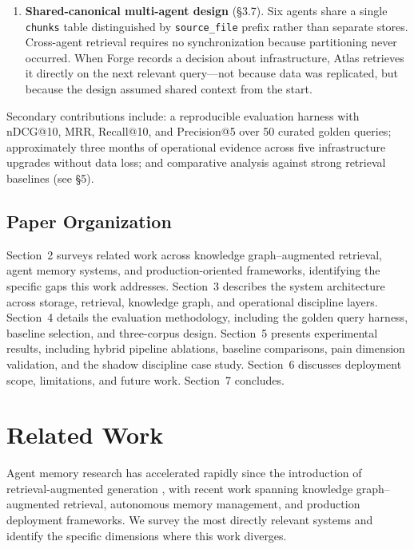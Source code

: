 \begin{enumerate}
\item \textbf{Shared-canonical multi-agent design} (\S3.7). Six agents share a single
\texttt{chunks} table distinguished by \texttt{source\_file} prefix rather than separate
stores. Cross-agent retrieval requires no synchronization because partitioning never
occurred. When Forge records a decision about infrastructure, Atlas retrieves it directly
on the next relevant query---not because data was replicated, but because the design
assumed shared context from the start.

\end{enumerate}

Secondary contributions include: a reproducible evaluation harness with nDCG@10, MRR,
Recall@10, and Precision@5 over 50 curated golden queries; approximately three months of operational
evidence across five infrastructure upgrades without data loss; and comparative analysis
against strong retrieval baselines (see \S5).

\subsection{Paper Organization}

Section~2 surveys related work across knowledge graph--augmented retrieval, agent memory
systems, and production-oriented frameworks, identifying the specific gaps this work
addresses. Section~3 describes the system architecture across storage, retrieval, knowledge
graph, and operational discipline layers. Section~4 details the evaluation methodology,
including the golden query harness, baseline selection, and three-corpus design. Section~5
presents experimental results, including hybrid pipeline ablations, baseline comparisons,
pain dimension validation, and the shadow discipline case study. Section~6 discusses
deployment scope, limitations, and future work. Section~7 concludes.

\section{Related Work}

Agent memory research has accelerated rapidly since the introduction of
retrieval-augmented generation \cite{lewis2020rag}, with recent work spanning knowledge
graph--augmented retrieval, autonomous memory management, and production deployment
frameworks. We survey the most directly relevant systems and identify the specific
dimensions where this work diverges.

